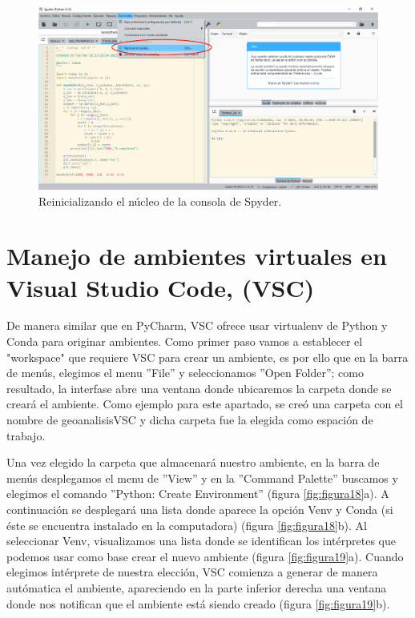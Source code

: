 \documentclass{article}
\begin{document}
	\begin{figure}[H]
		\centering
		\includegraphics[width=0.9\linewidth]{Figura17}
		\caption{Reinicializando el núcleo de la consola de Spyder.}
		\label{fig:figura17}
	\end{figure}
	
	\section{Manejo de ambientes virtuales en Visual Studio Code, (VSC)}
	De manera similar que en PyCharm, VSC ofrece usar virtualenv de Python y Conda para originar ambientes. Como primer paso vamos a establecer el "workspace" que requiere VSC para crear un ambiente, es por ello que en la barra de menús, elegimos el menu ''File'' y seleccionamos ''Open Folder''; como resultado, la interfase abre una ventana donde ubicaremos la carpeta donde se creará el ambiente. Como ejemplo para este apartado, se creó una carpeta con el nombre de geoanalisisVSC y dicha carpeta fue la elegida como espación de trabajo.\bigskip
	
	Una vez elegido la carpeta que almacenará nuestro ambiente, en la barra de menús desplegamos el menu de ''View'' y  en la ''Command Palette'' buscamos y elegimos el comando ''Python: Create Environment'' (figura \ref{fig:figura18}a). A continuación se desplegará una lista donde aparece la opción Venv y Conda (si éste se encuentra instalado en la computadora) (figura \ref{fig:figura18}b). Al seleccionar Venv, visualizamos una lista donde se identifican los intérpretes que podemos usar como base crear el nuevo ambiente (figura \ref{fig:figura19}a). Cuando elegimos intérprete de nuestra elección, VSC comienza a generar de manera autómatica el ambiente, apareciendo en la parte inferior derecha una ventana donde nos notifican que el ambiente está siendo creado (figura \ref{fig:figura19}b).
	
\end{document}
